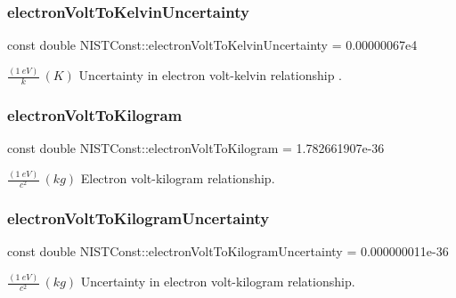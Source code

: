 \subsubsection{\texorpdfstring{electron\+Volt\+To\+Kelvin\+Uncertainty}{electronVoltToKelvinUncertainty}}
{\footnotesize\ttfamily const double N\+I\+S\+T\+Const\+::electron\+Volt\+To\+Kelvin\+Uncertainty = 0.\+00000067e4}

$\frac{(1\ eV)}{k} \ (K)$ Uncertainty in electron volt-\/kelvin relationship . \mbox{\label{group___electron_volt_ga21481a673cb040e04f7f8f95581ece0c}} 
\subsubsection{\texorpdfstring{electron\+Volt\+To\+Kilogram}{electronVoltToKilogram}}
{\footnotesize\ttfamily const double N\+I\+S\+T\+Const\+::electron\+Volt\+To\+Kilogram = 1.\+782661907e-\/36}

$\frac{(1\ eV)}{c^2} \ (kg)$ Electron volt-\/kilogram relationship. \mbox{\label{group___electron_volt_ga77aec1f5b68dd74739fe268fa4362a85}} 
\subsubsection{\texorpdfstring{electron\+Volt\+To\+Kilogram\+Uncertainty}{electronVoltToKilogramUncertainty}}
{\footnotesize\ttfamily const double N\+I\+S\+T\+Const\+::electron\+Volt\+To\+Kilogram\+Uncertainty = 0.\+000000011e-\/36}

$\frac{(1\ eV)}{c^2} \ (kg)$ Uncertainty in electron volt-\/kilogram relationship. 